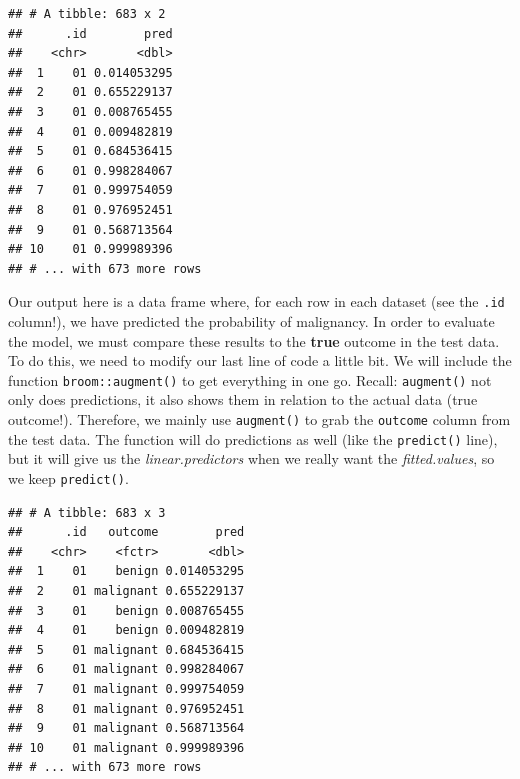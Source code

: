 \documentclass[]{article}
\newenvironment{Shaded}{\begin{snugshade}}{\end{snugshade}}
\newcommand{\KeywordTok}[1]{\textcolor[rgb]{0.13,0.29,0.53}{\textbf{#1}}}
\newcommand{\DataTypeTok}[1]{\textcolor[rgb]{0.13,0.29,0.53}{#1}}
\newcommand{\StringTok}[1]{\textcolor[rgb]{0.31,0.60,0.02}{#1}}
\newcommand{\OperatorTok}[1]{\textcolor[rgb]{0.81,0.36,0.00}{\textbf{#1}}}
\newcommand{\NormalTok}[1]{#1}
\begin{document}
\begin{verbatim}
## # A tibble: 683 x 2
##      .id        pred
##    <chr>       <dbl>
##  1    01 0.014053295
##  2    01 0.655229137
##  3    01 0.008765455
##  4    01 0.009482819
##  5    01 0.684536415
##  6    01 0.998284067
##  7    01 0.999754059
##  8    01 0.976952451
##  9    01 0.568713564
## 10    01 0.999989396
## # ... with 673 more rows
\end{verbatim}

Our output here is a data frame where, for each row in each dataset (see
the \texttt{.id} column!), we have predicted the probability of
malignancy. In order to evaluate the model, we must compare these
results to the \textbf{true} outcome in the test data. To do this, we
need to modify our last line of code a little bit. We will include the
function \texttt{broom::augment()} to get everything in one go. Recall:
\texttt{augment()} not only does predictions, it also shows them in
relation to the actual data (true outcome!). Therefore, we mainly use
\texttt{augment()} to grab the \texttt{outcome} column from the test
data. The function will do predictions as well (like the
\texttt{predict()} line), but it will give us the
\emph{linear.predictors} when we really want the \emph{fitted.values},
so we keep \texttt{predict()}.

\begin{Shaded}
\end{Shaded}

\begin{verbatim}
## # A tibble: 683 x 3
##      .id   outcome        pred
##    <chr>    <fctr>       <dbl>
##  1    01    benign 0.014053295
##  2    01 malignant 0.655229137
##  3    01    benign 0.008765455
##  4    01    benign 0.009482819
##  5    01 malignant 0.684536415
##  6    01 malignant 0.998284067
##  7    01 malignant 0.999754059
##  8    01 malignant 0.976952451
##  9    01 malignant 0.568713564
## 10    01 malignant 0.999989396
## # ... with 673 more rows
\end{verbatim}
\end{document}
